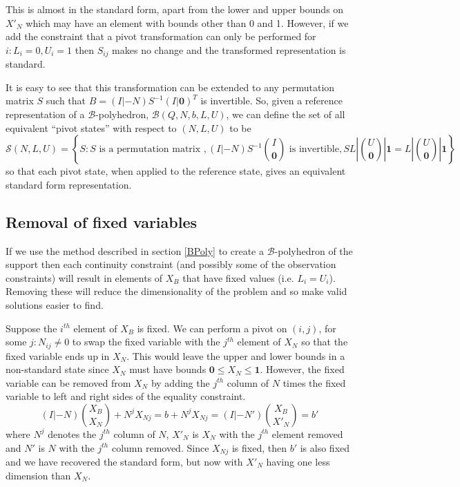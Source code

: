 \documentclass{article}
\begin{document}
This is almost in the standard form, apart from the lower and upper bounds on $X'_N$ which may have an element with bounds other than 0 and 1. However, if we add the constraint that a pivot transformation can only be performed for $i: L_i = 0, U_i=1$ then $S_{ij}$ makes no change and the transformed representation is standard.

It is easy to see that this transformation can be extended to any permutation matrix $S$ such that $B = (I|-N)S^{-1}(I|\mathbf{0})^T$ is invertible. So, given a reference representation of a $\mathcal{B}$-polyhedron, $\mathcal{B}(Q,N,b,L,U)$, we can define the set of all equivalent ``pivot states'' with respect to $(N,L,U)$ to be
\[
\mathcal{S}(N,L,U) = \left\{S : S \text{ is a permutation matrix }, (I|-N)S^{-1}{I\choose \mathbf{0}} \text{ is invertible}, S{L|U \choose \mathbf{0}|\mathbf{1}} = {L|U \choose \mathbf{0}|\mathbf{1}} \right\}
\]
so that each pivot state, when applied to the reference state, gives an equivalent standard form representation.

\subsection{Removal of fixed variables}

If we use the method described in section \ref{BPoly} to create a $\mathcal{B}$-polyhedron of the support then each continuity constraint (and possibly some of the observation constraints) will result in elements of $X_B$ that have fixed values (i.e. $L_i = U_i$). Removing these will reduce the dimensionality of the problem and so make valid solutions easier to find.

Suppose the $i^{th}$ element of $X_B$ is fixed. We can perform a pivot on $(i,j)$, for some $j:N_{ij}\ne 0$ to swap the fixed variable with the $j^{th}$ element of $X_N$ so that the fixed variable ends up in $X_N$. This would leave the upper and lower bounds in a non-standard state since $X_N$ must have bounds $\mathbf{0} \le X_N \le \mathbf{1}$. However, the fixed variable can be removed from $X_N$ by adding the $j^{th}$ column of $N$ times the fixed variable to left and right sides of the equality constraint.
\[
(I|-N){X_B \choose X_N} + N^jX_{Nj} = b + N^jX_{Nj} = (I|-N'){X_B \choose X'_N} = b'
\]
where $N^j$ denotes the $j^{th}$ column of $N$, $X'_N$ is $X_N$ with the $j^{th}$ element removed and $N'$ is $N$ with the $j^{th}$ column removed. Since $X_{Nj}$ is fixed, then $b'$ is also fixed and we have recovered the standard form, but now with $X'_N$ having one less dimension than $X_N$.
\end{document}
